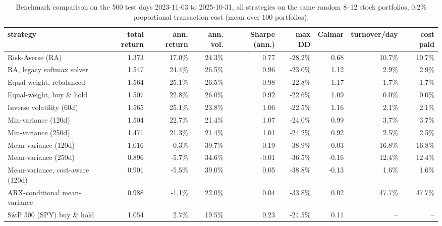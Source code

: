 \begin{table}[ht!]
\centering
\footnotesize
\setlength{\tabcolsep}{4pt}
\begin{tabular}{lrrrrrrrr}
\hline
strategy & total return & ann. return & ann. vol. & Sharpe (ann.) & max DD & Calmar & turnover/day & cost paid \\
\hline
Risk-Averse (RA) & 1.373 & 17.0\% & 24.3\% & 0.77 & -28.2\% & 0.68 & 10.7\% & 10.7\% \\
RA, legacy softmax solver & 1.547 & 24.4\% & 26.5\% & 0.96 & -23.0\% & 1.12 & 2.9\% & 2.9\% \\
Equal-weight, rebalanced & 1.564 & 25.1\% & 26.5\% & 0.98 & -22.8\% & 1.17 & 1.7\% & 1.7\% \\
Equal-weight, buy \& hold & 1.507 & 22.8\% & 26.0\% & 0.92 & -22.6\% & 1.09 & 0.0\% & 0.0\% \\
Inverse volatility (60d) & 1.565 & 25.1\% & 23.8\% & 1.06 & -22.5\% & 1.16 & 2.1\% & 2.1\% \\
Min-variance (120d) & 1.504 & 22.7\% & 21.4\% & 1.07 & -24.0\% & 0.99 & 3.7\% & 3.7\% \\
Min-variance (250d) & 1.471 & 21.3\% & 21.4\% & 1.01 & -24.2\% & 0.92 & 2.5\% & 2.5\% \\
Mean-variance (120d) & 1.016 & 0.3\% & 39.7\% & 0.19 & -38.9\% & 0.03 & 16.8\% & 16.8\% \\
Mean-variance (250d) & 0.896 & -5.7\% & 34.6\% & -0.01 & -36.5\% & -0.16 & 12.4\% & 12.4\% \\
Mean-variance, cost-aware (120d) & 0.901 & -5.5\% & 39.0\% & 0.05 & -38.8\% & -0.13 & 1.6\% & 1.6\% \\
ARX-conditional mean-variance & 0.988 & -1.1\% & 22.0\% & 0.04 & -33.8\% & 0.02 & 47.7\% & 47.7\% \\
S\&P 500 (SPY) buy \& hold & 1.054 & 2.7\% & 19.5\% & 0.23 & -24.5\% & 0.11 & -- & -- \\
\hline
\end{tabular}
\caption{Benchmark comparison on the 500 test days 2023-11-03 to 2025-10-31, all strategies on the same random 8--12 stock portfolios, 0.2\% proportional transaction cost (mean over 100 portfolios).}
\label{tab:bench_mean_bear2022}
\end{table}

